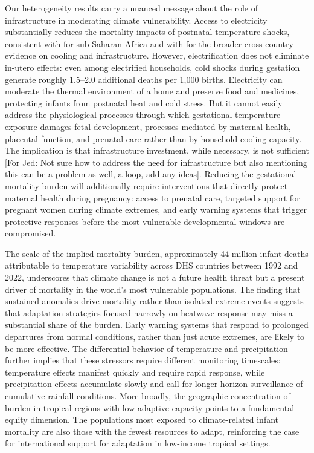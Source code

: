 \documentclass[a4paper]{article}
\begin{document}
Our heterogeneity results carry a nuanced message about the role of infrastructure in moderating climate vulnerability. Access to electricity substantially reduces the mortality impacts of postnatal temperature shocks, consistent with \textcite{wang2025} for sub-Saharan Africa and with \textcite{burke2025} for the broader cross-country evidence on cooling and infrastructure. However, electrification does not eliminate in-utero effects: even among electrified households, cold shocks during gestation generate roughly 1.5--2.0 additional deaths per 1,000 births. Electricity can moderate the thermal environment of a home and preserve food and medicines, protecting infants from postnatal heat and cold stress. But it cannot easily address the physiological processes through which gestational temperature exposure damages fetal development, processes mediated by maternal health, placental function, and prenatal care rather than by household cooling capacity. The implication is that infrastructure investment, while necessary, is not sufficient [For Jed: Not sure how to address the need for infrastructure but also mentioning this can be a problem as well, a loop, add any ideas]. Reducing the gestational mortality burden will additionally require interventions that directly protect maternal health during pregnancy: access to prenatal care, targeted support for pregnant women during climate extremes, and early warning systems that trigger protective responses before the most vulnerable developmental windows are compromised.

The scale of the implied mortality burden, approximately 44 million infant deaths attributable to temperature variability across DHS countries between 1992 and 2022, underscores that climate change is not a future health threat but a present driver of mortality in the world's most vulnerable populations. The finding that sustained anomalies drive mortality rather than isolated extreme events suggests that adaptation strategies focused narrowly on heatwave response may miss a substantial share of the burden. Early warning systems that respond to prolonged departures from normal conditions, rather than just acute extremes, are likely to be more effective. The differential behavior of temperature and precipitation further implies that these stressors require different monitoring timescales: temperature effects manifest quickly and require rapid response, while precipitation effects accumulate slowly and call for longer-horizon surveillance of cumulative rainfall conditions. More broadly, the geographic concentration of burden in tropical regions with low adaptive capacity points to a fundamental equity dimension. The populations most exposed to climate-related infant mortality are also those with the fewest resources to adapt, reinforcing the case for international support for adaptation in low-income tropical settings.
\end{document}
